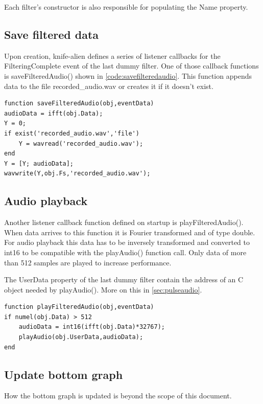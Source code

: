 \documentclass[journal]{IEEEtran}
\begin{document}
Each filter's constructor is also responsible for populating the Name property.

\subsection{Save filtered data}
Upon creation, knife-alien defines a series of listener callbacks for the FilteringComplete event of the last dummy filter. One of those callback functions is saveFilteredAudio() shown in \autoref*{code:savefilteredaudio}. This function appends data to the file recorded\_audio.wav or creates it if it doesn't exist.

\begin{lstlisting}[caption={saveFilteredAudio.m: Append filtered audio to recorded\_audio.wav},
                   label={code:savefilteredaudio}]
function saveFilteredAudio(obj,eventData)
audioData = ifft(obj.Data);
Y = 0;
if exist('recorded_audio.wav','file')
    Y = wavread('recorded_audio.wav');
end
Y = [Y; audioData];
wavwrite(Y,obj.Fs,'recorded_audio.wav');
\end{lstlisting}

\subsection{Audio playback}
Another listener callback function defined on startup is playFilteredAudio(). When data arrives to this function it is Fourier transformed and of type double. For audio playback this data has to be inversely transformed and converted to int16 to be compatible with the playAudio() function call. Only data of more than 512 samples are played to increase performance.

The UserData property of the last dummy filter contain the address of an C object needed by playAudio(). More on this in \autoref*{sec:pulseaudio}.

\begin{lstlisting}[caption={playFilteredAudio.m: Inverse transform, convert and play data},
                   label={code:playfilteredaudio}]
function playFilteredAudio(obj,eventData)
if numel(obj.Data) > 512
    audioData = int16(ifft(obj.Data)*32767);
    playAudio(obj.UserData,audioData);
end
\end{lstlisting}

\subsection{Update bottom graph}
How the bottom graph is updated is beyond the scope of this document.
\end{document}
